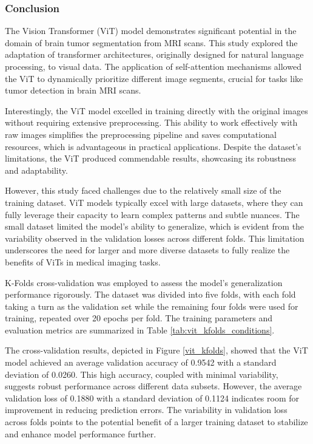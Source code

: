 \subsubsection{Conclusion}

The Vision Transformer (ViT) model demonstrates significant potential in the domain of brain tumor segmentation from MRI scans. This study explored the adaptation of transformer architectures, originally designed for natural language processing, to visual data. The application of self-attention mechanisms allowed the ViT to dynamically prioritize different image segments, crucial for tasks like tumor detection in brain MRI scans.

Interestingly, the ViT model excelled in training directly with the original images without requiring extensive preprocessing. This ability to work effectively with raw images simplifies the preprocessing pipeline and saves computational resources, which is advantageous in practical applications. Despite the dataset's limitations, the ViT produced commendable results, showcasing its robustness and adaptability.

However, this study faced challenges due to the relatively small size of the training dataset. ViT models typically excel with large datasets, where they can fully leverage their capacity to learn complex patterns and subtle nuances. The small dataset limited the model's ability to generalize, which is evident from the variability observed in the validation losses across different folds. This limitation underscores the need for larger and more diverse datasets to fully realize the benefits of ViTs in medical imaging tasks.

K-Folds cross-validation was employed to assess the model's generalization performance rigorously. The dataset was divided into five folds, with each fold taking a turn as the validation set while the remaining four folds were used for training, repeated over 20 epochs per fold. The training parameters and evaluation metrics are summarized in Table \ref{tab:vit_kfolds_conditions}.

The cross-validation results, depicted in Figure \ref{vit_kfolds}, showed that the ViT model achieved an average validation accuracy of 0.9542 with a standard deviation of 0.0260. This high accuracy, coupled with minimal variability, suggests robust performance across different data subsets. However, the average validation loss of 0.1880 with a standard deviation of 0.1124 indicates room for improvement in reducing prediction errors. The variability in validation loss across folds points to the potential benefit of a larger training dataset to stabilize and enhance model performance further.

